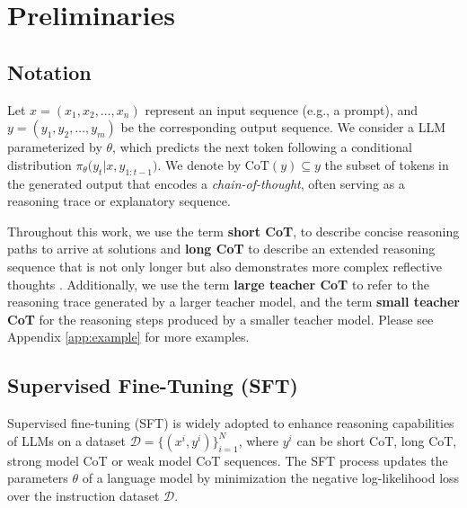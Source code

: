 \section{Preliminaries}

\subsection{Notation}
Let $x = (x_1, x_2, \dots, x_n)$ represent an input sequence (e.g., a prompt), and $y = (y_1, y_2, \dots, y_m)$ be the corresponding output sequence.
We consider a LLM parameterized by $\theta$, which predicts the next token following a conditional distribution 
$\pi_\theta \bigl(y_t|x, y_{1:t-1}\bigr)$. We denote by $\text{CoT}(y) \subseteq y$ the subset of tokens in the generated output that encodes a \emph{chain-of-thought}, often serving as a reasoning trace or explanatory sequence.

Throughout this work, we use the term \textbf{short CoT}, to describe concise reasoning paths to arrive at solutions \citep{min2024imitateexploreselfimprovereproduction,yeo2025demystifyinglongchainofthoughtreasoning} and \textbf{long CoT} to describe an extended reasoning sequence that is not only longer but also demonstrates more complex reflective thoughts \citep{QwenTeam2024b, yeo2025demystifyinglongchainofthoughtreasoning}. Additionally, we use the term \textbf{large teacher CoT} to refer to the reasoning trace generated by a larger teacher model, and the term \textbf{small teacher CoT} for the reasoning steps produced by a smaller teacher model.
Please see Appendix \ref{app:example} for more examples.




\subsection{Supervised Fine-Tuning (SFT)} 

Supervised fine-tuning (SFT) is widely adopted to enhance reasoning capabilities of LLMs on a dataset $\mathcal{D} = \{(x^i, y^i)\}_{i=1}^N$, where $y^i$ can be short CoT, long CoT, strong model CoT or weak model CoT sequences.
The SFT process updates the parameters $\theta$ of a language model by minimization the negative log-likelihood loss over the instruction dataset $\mathcal{D}$. 
